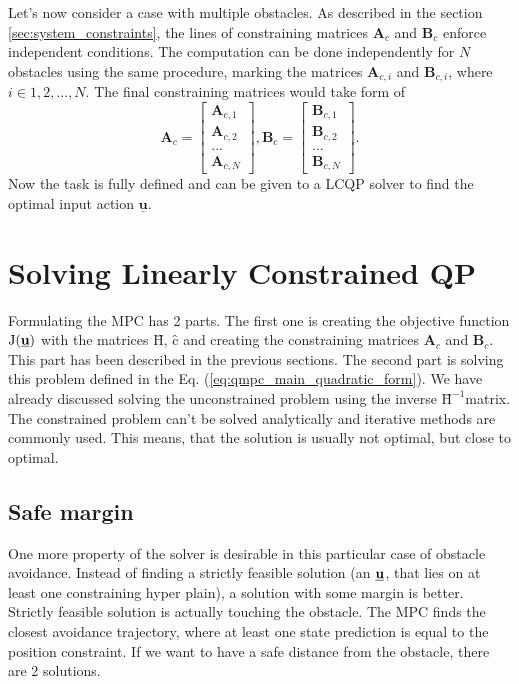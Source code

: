 \documentclass[a4paper,11pt,titlepage]{article}
\newcommand{\uvec}{\textbf{\underline{u}}}
\newcommand{\macJ}{\mathrm{J}(\uvec)}
\newcommand{\macHr}{\textbf{\^H}}
\begin{document}
Let's now consider a case with multiple obstacles. As described in the section \ref{sec:system_constraints}, the lines of constraining matrices $\textbf{A}_c$ and $\textbf{B}_c$  enforce independent conditions. The computation can be done independently for $N$ obstacles using the same procedure, marking the matrices $\textbf{A}_{c,i}$ and $\textbf{B}_{c,i}$, where $i \in {1, 2, ..., N}$. The final constraining matrices would take form of
\begin{equation}
\textbf{A}_c =
  \begin{bmatrix}
  \textbf{A}_{c,1} \\
  \textbf{A}_{c,2} \\
  ...	   \\
  \textbf{A}_{c,N}
  \end{bmatrix},\textbf{B}_c = \begin{bmatrix}
  \textbf{B}_{c,1} \\
  \textbf{B}_{c,2} \\
  ...	   \\
  \textbf{B}_{c,N}
  \end{bmatrix}.
\end{equation}
Now the task is fully defined and can be given to a LCQP solver to find the optimal input action $\underline{\textbf{u}}$. 

\section{Solving Linearly Constrained QP}
Formulating the MPC has 2 parts. The first one is creating the objective function $\macJ$ with the matrices $\textbf{\^H}$, $\textbf{\^c}$ and creating the constraining matrices $\textbf{A}_c$ and $\textbf{B}_c$. This part has been described in the previous sections. The second part is solving this problem defined in the Eq. (\ref{eq:qmpc_main_quadratic_form}). We have already discussed solving the unconstrained problem using the inverse $\macHr^{-1}$matrix. The constrained problem can't be solved analytically and iterative methods are commonly used. This means, that the solution is usually not optimal, but close to optimal. 

\subsection{Safe margin}
\label{sec:safe_margin}
One more property of the solver is desirable in this particular case of obstacle avoidance. Instead of finding a strictly feasible solution (an $\uvec$, that lies on at least one constraining hyper plain), a solution with some margin is better. Strictly feasible solution is actually touching the obstacle. The MPC finds the closest avoidance trajectory, where at least one state prediction is equal to the position constraint. If we want to have a safe distance from the obstacle, there are 2 solutions. 
\end{document}
